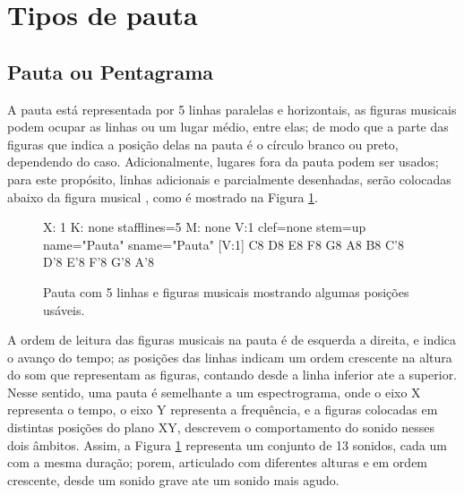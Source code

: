 \section{Tipos de pauta}
\label{sec:tipospauta}

\subsection{Pauta ou Pentagrama}
\label{sec:pauta}
A pauta está representada por 5 linhas paralelas e horizontais, 
as figuras musicais podem ocupar as linhas ou um lugar médio, entre elas;
de modo que a parte das figuras que indica a posição delas na pauta é o círculo branco ou preto, dependendo do caso.
Adicionalmente, lugares fora da pauta podem ser usados; 
para este propósito, linhas adicionais e parcialmente desenhadas, 
serão colocadas abaixo da figura musical \cite[pp. 10]{cardoso1973curso},
como é mostrado na Figura \ref{fig:abc-pauta5}.
\begin{figure}[H]
\centering
\begin{abc}[name=abc-pauta5]
%
X: 1 %
K: none stafflines=5 %
M: none %
V:1 clef=none stem=up name="Pauta"   sname="Pauta"
%
[V:1] C8 D8 E8 F8 G8 A8 B8 C'8 D'8 E'8 F'8 G'8 A'8
\end{abc}
\caption{Pauta com 5 linhas e figuras musicais mostrando algumas posições usáveis.}
\label{fig:abc-pauta5}
\end{figure}
A ordem de leitura das figuras musicais na pauta é de esquerda a direita,
e indica o avanço  do tempo;
as posições das linhas indicam um ordem crescente na altura do som que representam as figuras,
contando desde a linha inferior ate a superior. Nesse sentido, 
uma pauta é semelhante a um espectrograma, onde o eixo X representa o tempo,
o eixo Y representa a frequência, e a figuras colocadas em distintas posições do plano XY, descrevem
o comportamento do sonido nesses dois âmbitos. Assim, a Figura \ref{fig:abc-pauta5}
representa um conjunto de 13 sonidos, cada um com a mesma duração; 
porem, articulado com diferentes alturas e em ordem crescente, 
desde um sonido grave ate um sonido mais agudo.


